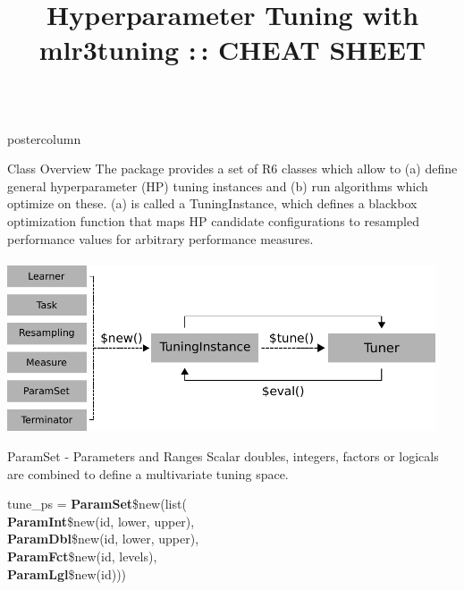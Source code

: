 \documentclass{beamer}
\title{Hyperparameter Tuning with mlr3tuning :\,: CHEAT SHEET} %
\newlength{\columnheight} %
\begin{document}
\begin{frame}[fragile]{}
	\begin{columns}
		\begin{column}{.245\textwidth}
			\begin{beamercolorbox}[center]{postercolumn}
				\begin{minipage}{.98\textwidth}
					\parbox[t][\columnheight]{\textwidth}{
						\begin{myblock}{Class Overview}
							The package provides a set of R6 classes which allow to (a) define general
							hyperparameter (HP) tuning instances and (b) run algorithms which optimize on these.
							(a) is called a TuningInstance, which defines a blackbox optimization function that maps HP candidate configurations to resampled performance values for arbitrary performance measures.\\
							\\
							\includegraphics[width=0.95\textwidth]{img/class_diagram.pdf}
						\end{myblock}
						\begin{myblock}{ParamSet - Parameters and Ranges}
							Scalar doubles, integers, factors or logicals are combined to define a multivariate tuning space.
							\\
							\begin{codeboxmultiline}[width=20.75cm]
								tune\_ps = \textbf{ParamSet}\$new(list(\\
								\hspace*{1ex}\textbf{ParamInt}\$new(id, lower, upper),\\
								\hspace*{1ex}\textbf{ParamDbl}\$new(id, lower, upper),\\
								\hspace*{1ex}\textbf{ParamFct}\$new(id, levels),\\
								\hspace*{1ex}\textbf{ParamLgl}\$new(id)))
							\end{codeboxmultiline}

\end{myblock}}
\end{minipage}
\end{beamercolorbox}
\end{column}
\end{columns}
\end{frame}
\end{document}
